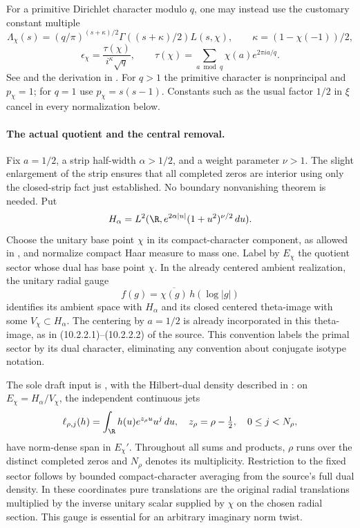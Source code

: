 For a primitive Dirichlet character modulo $q$, one may instead use the customary constant multiple
\[
 \Lambda_\chi(s)=(q/\pi)^{(s+\kappa)/2}
 \Gamma((s+\kappa)/2)L(s,\chi),\qquad
 \kappa=(1-\chi(-1))/2,
\]
\[
 \epsilon_\chi=\frac{\tau(\chi)}{i^\kappa\sqrt q},\qquad
 \tau(\chi)=\sum_{a\bmod q}\chi(a)e^{2\pi ia/q}.
\]
See \cite[(25.15.5)--(25.15.6)]{dlmf2515} and the derivation in \cite[\S6.1; (6.2.2)]{kedlayaFE}. For $q>1$ the primitive character is nonprincipal and $p_\chi=1$; for $q=1$ use $p_\chi=s(s-1)$. Constants such as the usual factor $1/2$ in $\xi$ cancel in every normalization below.

\paragraph{The actual quotient and the central removal.}
Fix $a=1/2$, a strip half-width $\alpha>1/2$, and a weight parameter $\nu>1$. The slight enlargement of the strip ensures that all completed zeros are interior using only the closed-strip fact just established. No boundary nonvanishing theorem is needed. Put
\[
 H_\alpha=L^2(\R,e^{2\alpha|u|}(1+u^2)^{\nu/2}\,du).
\]
Choose the unitary base point $\chi$ in its compact-character component, as allowed in \cite[Notation 10.2.2.1, p.~445]{masullo}, and normalize compact Haar measure to mass one. Label by $E_\chi$ the quotient sector whose dual has base point $\chi$. In the already centered ambient realization, the unitary radial gauge
\[
 f(g)=\overline{\chi(g)}\,h(\log|g|)
\]
identifies its ambient space with $H_\alpha$ and its closed centered theta-image with some $V_\chi\subset H_\alpha$. The centering by $a=1/2$ is already incorporated in this theta-image, as in (10.2.2.1)--(10.2.2.2) of the source. This convention labels the primal sector by its dual character, eliminating any convention about conjugate isotype notation.

The sole draft input is \cite[Theorem 10.2.2.1, (10.2.2.4)--(10.2.2.6), p.~446]{masullo}, with the Hilbert-dual density described in \cite[Remark 10.2.1.2, pp.~440--441]{masullo}: on $E_\chi=H_\alpha/V_\chi$, the independent continuous jets
\[
 \ell_{\rho,j}(h)=\int_\R h(u)e^{z_\rho u}u^j\,du,
 \quad z_\rho=\rho-\tfrac12,\quad 0\le j<N_\rho,
\]
have norm-dense span in $E_\chi'$. Throughout all sums and products, $\rho$ runs over the distinct completed zeros and $N_\rho$ denotes its multiplicity. Restriction to the fixed sector follows by bounded compact-character averaging from the source's full dual density. In these coordinates pure translations are the original radial translations multiplied by the inverse unitary scalar supplied by $\chi$ on the chosen radial section. This gauge is essential for an arbitrary imaginary norm twist.

